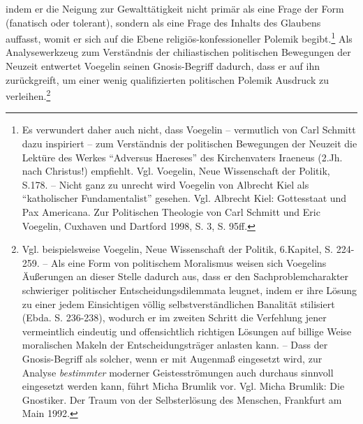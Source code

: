 indem er die Neigung zur Gewalttätigkeit nicht primär als eine Frage der Form
(fanatisch oder tolerant), sondern als eine Frage des Inhalts des Glaubens
auf\/fasst, womit er sich auf die Ebene religiös-konfessioneller Polemik
begibt.\footnote{Es verwundert daher auch nicht, dass Voegelin -- vermutlich
  von Carl Schmitt dazu inspiriert -- zum Verständnis der politischen
  Bewegungen der Neuzeit die Lektüre des Werkes "`Adversus Haereses"' des
  Kirchenvaters Iraeneus (2.Jh. nach Christus!)  empfiehlt.  Vgl. Voegelin,
  Neue Wissenschaft der Politik, S.178. -- Nicht ganz zu unrecht wird Voegelin
  von Albrecht Kiel als "`katholischer Fundamentalist"' gesehen. Vgl.
  Albrecht Kiel: Gottesstaat und Pax Americana. Zur Politischen Theologie von
  Carl Schmitt und Eric Voegelin, Cuxhaven und Dartford 1998, S. 3, S. 95ff.}
Als Analysewerkzeug zum Verständnis der chiliastischen politischen Bewegungen
der Neuzeit entwertet Voegelin seinen Gnosis-Begriff dadurch, dass er auf ihn
zurückgreift, um einer wenig qualifizierten politischen Polemik Ausdruck zu
verleihen.\footnote{Vgl.  beispielsweise Voegelin, Neue Wissenschaft der
  Politik, 6.Kapitel, S.  224-259. -- Als eine Form von politischem Moralismus
  weisen sich Voegelins Äußerungen an dieser Stelle dadurch aus, dass er den
  Sachproblemcharakter schwieriger politischer Entscheidungsdilemmata leugnet,
  indem er ihre Lösung zu einer jedem Einsichtigen völlig selbstverständlichen
  Banalität stilisiert (Ebda.  S. 236-238), wodurch er im zweiten Schritt die
  Verfehlung jener vermeintlich eindeutig und offensichtlich richtigen
  Lösungen auf billige Weise moralischen Makeln der Entscheidungsträger
  anlasten kann. -- Dass der Gnosis-Begriff als solcher, wenn er mit Augenmaß
  eingesetzt wird, zur Analyse {\em bestimmter} moderner Geistesströmungen
  auch durchaus sinnvoll eingesetzt werden kann, führt Micha Brumlik vor. Vgl.
  Micha Brumlik: Die Gnostiker.  Der Traum von der Selbsterlösung des
  Menschen, Frankfurt am Main 1992.}


